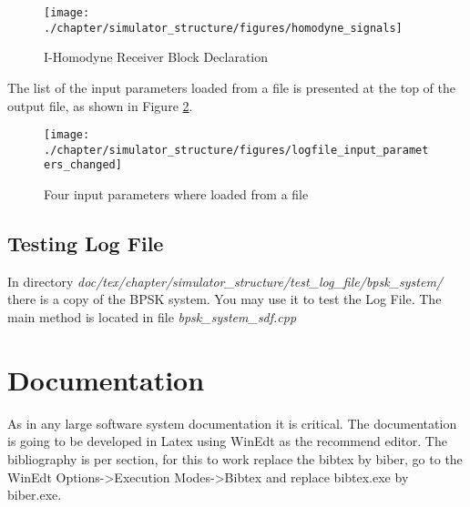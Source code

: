 \begin{refsection}
\renewcommand{\figurename}{Figure}
\begin{figure}[H]
\centering
\texttt{[image: ./chapter/simulator\_structure/figures/homodyne\_signals]}
\caption{I-Homodyne Receiver Block Declaration}
\label{fig:homodynesignals}
\end{figure}

The list of the input parameters loaded from a file is presented at the top of the output file, as shown in Figure \ref{fig:changedinputparameters}.

\begin{figure}[H]
\centering
\texttt{[image: ./chapter/simulator\_structure/figures/logfile\_input\_parameters\_changed]}
\caption{Four input parameters where loaded from a file}
\label{fig:changedinputparameters}
\end{figure}

\subsection{Testing Log File}
In directory \textit{doc/tex/chapter/simulator\_structure/test\_log\_file/bpsk\_system/} there is a copy of the BPSK system. You may use it to test the Log File. The main method is located in file \textit{bpsk\_system\_sdf.cpp}

\clearpage
\printbibliography[heading=subbibliography]
\end{refsection}



\section{Documentation}

As in any large software system documentation it is critical.
The documentation is going to be developed in Latex using WinEdt as the recommend editor.
The bibliography is per section, for this to work replace the bibtex by biber, go to the WinEdt Options->Execution Modes->Bibtex and replace bibtex.exe by biber.exe.

\cleardoublepage
